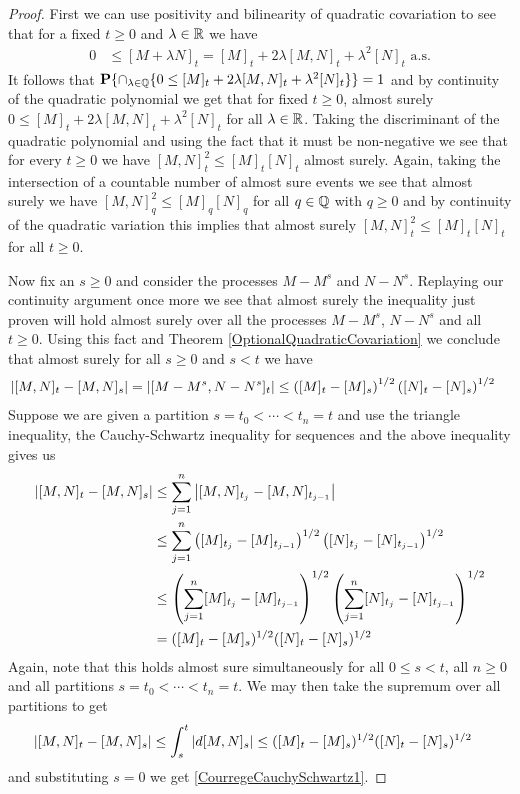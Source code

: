 \begin{proof}
First we can use positivity and bilinearity of quadratic covariation to see that for a fixed $t \geq 0$ and $\lambda \in \mathbb{R}$ we have 
\begin{align*}
0 &\leq [M + \lambda N]_t = [M]_t + 2\lambda[M,N]_t + \lambda^2[N]_t \text{ a.s.}
\end{align*}
It follows that $\textbf{P}\{\cap_{\lambda \in \mathbb{Q}} \lbrace 0 \leq  [M]_t + 2\lambda[M,N]_t + \lambda^2[N]_t  \rbrace\} = 1$ and by continuity of the quadratic polynomial we get that for fixed $t \geq 0$, almost surely $0 \leq [M]_t + 2\lambda[M,N]_t + \lambda^2[N]_t$ for all $\lambda \in \mathbb{R}$.  Taking the discriminant of the quadratic polynomial and using the fact that it must be non-negative we see that for every $t \geq 0$ we have $[M,N]_t^2 \leq [M]_t [N]_t$ almost surely.  Again, taking the intersection of a countable number of almost sure events we see that almost surely we have $[M,N]_q^2 \leq [M]_q [N]_q$ for all $q \in \mathbb{Q}$ with $q \geq 0$ and by continuity of the quadratic variation this implies that almost surely $[M,N]_t^2 \leq [M]_t [N]_t$ for all $t \geq 0$.

Now fix an $s \geq 0$ and consider the processes $M - M^s$ and $N - N^s$.  Replaying our continuity argument once more we see that almost surely the inequality just proven will hold almost surely over all the processes $M - M^s$, $N - N^s$ and all $t \geq 0$.   Using this fact and Theorem \ref{OptionalQuadraticCovariation} we conclude that almost surely for all $s \geq 0$ and $s < t$ we have
\begin{align*}
\left \vert [M,N]_t - [M,N]_s  \right \vert &=\left \vert  [M - M^s, N-N^s]_t \right \vert \leq \left([M]_t - [M]_s\right)^{1/2} \left([N]_t - [N]_s\right)^{1/2}
\end{align*}
Suppose we are given a partition $s=t_0 < \dotsb < t_n=t$ and use the triangle inequality, the Cauchy-Schwartz inequality for sequences and the above inequality gives us 
\begin{align*}
\left \vert [M,N]_t - [M,N]_s \right \vert &\leq \sum_{j=1}^n \left \vert [M,N]_{t_j} - [M,N]_{t_{j-1}} \right \vert \\
&\leq \sum_{j=1}^n \left([M]_{t_j} - [M]_{t_{j-1}}\right)^{1/2} \left([N]_{t_j} - [N]_{t_{j-1}}\right)^{1/2} \\
&\leq  \left(\sum_{j=1}^n [M]_{t_j} - [M]_{t_{j-1}}\right)^{1/2} \left(\sum_{j=1}^n [N]_{t_j} - [N]_{t_{j-1}}\right)^{1/2} \\
&= ([M]_t - [M]_s)^{1/2} ([N]_t-[N]_s)^{1/2}
\end{align*}
Again, note that this holds almost sure simultaneously for all $0 \leq s < t$, all $n \geq 0$ and all partitions $s=t_0 < \dotsb < t_n=t$.  We may then take the supremum over all partitions to get 
\begin{align*}
\left \vert [M,N]_t - [M,N]_s \right \vert &\leq \int_s^t \left \vert d[M,N]_s \right \vert \leq ([M]_t - [M]_s)^{1/2} ([N]_t-[N]_s)^{1/2}
\end{align*}
and substituting $s=0$ we get \eqref{CourregeCauchySchwartz1}.


\end{proof}
